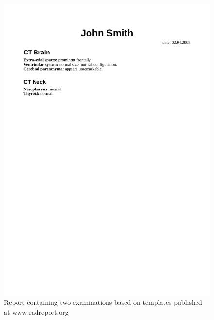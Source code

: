 \documentclass[12pt, twoside, openany]{report}
\theoremstyle{definition}
\begin{document}
\begin{figure}
	\centering
	\includegraphics[width=\linewidth, trim={0 20cm 0cm 2.5cm},clip]{rendered-report-eng}
	\caption{Report containing two examinations based on templates published at www.radreport.org	\label{fig:rendered-report-eng}}
	
\end{figure}
\end{document}
